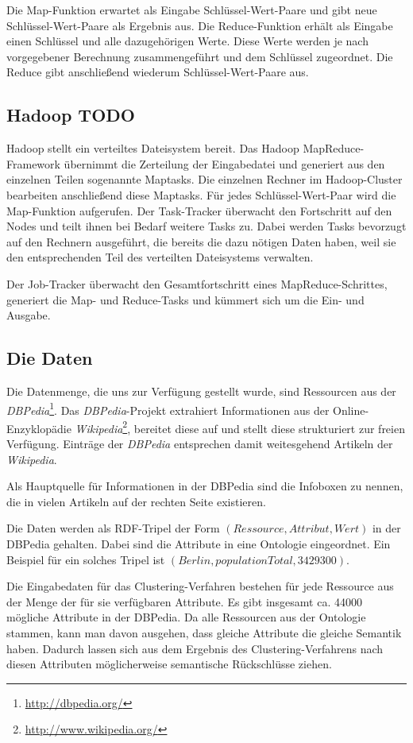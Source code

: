 \documentclass[a4paper]{llncs}
\begin{document}
Die Map-Funktion erwartet als Eingabe Schlüssel-Wert-Paare und gibt neue Schlüssel-Wert-Paare als Ergebnis aus.
Die Reduce-Funktion erhält als Eingabe einen Schlüssel und alle dazugehörigen Werte.
Diese Werte werden je nach vorgegebener Berechnung zusammengeführt und dem Schlüssel zugeordnet.
Die Reduce gibt anschließend wiederum Schlüssel-Wert-Paare aus.

\subsection{Hadoop TODO}
Hadoop stellt ein verteiltes Dateisystem bereit.
Das Hadoop MapReduce-Framework übernimmt die Zerteilung der Eingabedatei und generiert aus den einzelnen Teilen sogenannte Maptasks.
Die einzelnen Rechner im Hadoop-Cluster bearbeiten anschließend diese Maptasks.
Für jedes Schlüssel-Wert-Paar wird die Map-Funktion aufgerufen. Der Task-Tracker überwacht den Fortschritt auf den Nodes und teilt ihnen bei Bedarf weitere Tasks zu. Dabei werden Tasks bevorzugt auf den Rechnern ausgeführt, die bereits die dazu nötigen Daten haben, weil sie den entsprechenden Teil des verteilten Dateisystems verwalten.

Der Job-Tracker überwacht den Gesamtfortschritt eines MapReduce-Schrittes, generiert die Map- und Reduce-Tasks und kümmert sich um die Ein- und Ausgabe.

\subsection{Die Daten}
Die Datenmenge, die uns zur Verfügung gestellt wurde, sind Ressourcen aus der \emph{DBPedia}\footnote{\url{http://dbpedia.org/}}.
Das \emph{DBPedia}-Projekt extrahiert Informationen aus der Online-Enzyklopädie \emph{Wikipedia}\footnote{\url{http://www.wikipedia.org/}}, bereitet diese auf und stellt diese strukturiert zur freien Verfügung.
Einträge der \emph{DBPedia} entsprechen damit weitesgehend Artikeln der \emph{Wikipedia}.

Als Hauptquelle für Informationen in der DBPedia sind die Infoboxen zu nennen, die in vielen Artikeln auf der rechten Seite existieren.

Die Daten werden als RDF-Tripel der Form $(Ressource, Attribut, Wert)$ in der DBPedia gehalten. Dabei sind die Attribute in eine Ontologie eingeordnet.
Ein Beispiel für ein solches Tripel ist $(Berlin, populationTotal, 3429300)$.

Die Eingabedaten für das Clustering-Verfahren bestehen für jede Ressource aus der Menge der für sie verfügbaren Attribute. 
Es gibt insgesamt ca. 44000 mögliche Attribute in der DBPedia. Da alle Ressourcen aus der Ontologie stammen, kann man davon ausgehen, dass gleiche Attribute die gleiche Semantik haben.
Dadurch lassen sich aus dem Ergebnis des Clustering-Verfahrens nach diesen Attributen möglicherweise semantische Rückschlüsse ziehen.
\end{document}
